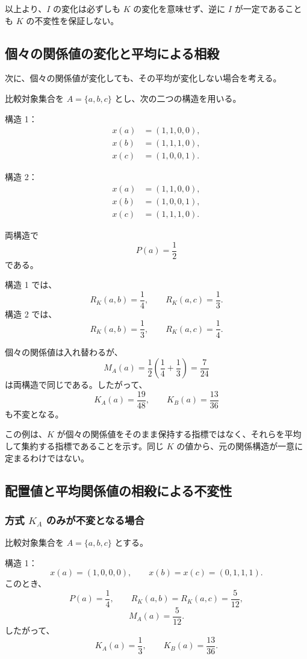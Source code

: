 \documentclass[a4paper,11pt]{ltjsarticle}
\begin{document}
以上より、$I$ の変化は必ずしも $K$ の変化を意味せず、逆に $I$ が一定であることも $K$ の不変性を保証しない。

\subsection{個々の関係値の変化と平均による相殺}

次に、個々の関係値が変化しても、その平均が変化しない場合を考える。

比較対象集合を $A=\{a,b,c\}$ とし、次の二つの構造を用いる。

構造 1：
\[
\begin{aligned}
x(a)&=(1,1,0,0),\\
x(b)&=(1,1,1,0),\\
x(c)&=(1,0,0,1).
\end{aligned}
\]

構造 2：
\[
\begin{aligned}
x(a)&=(1,1,0,0),\\
x(b)&=(1,0,0,1),\\
x(c)&=(1,1,1,0).
\end{aligned}
\]

両構造で
\[
P(a)=\frac12
\]
である。

構造 1 では、
\[
R_K(a,b)=\frac14,\qquad
R_K(a,c)=\frac13.
\]
構造 2 では、
\[
R_K(a,b)=\frac13,\qquad
R_K(a,c)=\frac14.
\]

個々の関係値は入れ替わるが、
\[
M_A(a)=\frac12\left(\frac14+\frac13\right)
=\frac7{24}
\]
は両構造で同じである。したがって、
\[
K_A(a)=\frac{19}{48},\qquad
K_B(a)=\frac{13}{36}
\]
も不変となる。

この例は、$K$ が個々の関係値をそのまま保持する指標ではなく、それらを平均して集約する指標であることを示す。同じ $K$ の値から、元の関係構造が一意に定まるわけではない。

\subsection{配置値と平均関係値の相殺による不変性}

\subsubsection{方式 $K_A$ のみが不変となる場合}

比較対象集合を $A=\{a,b,c\}$ とする。

構造 1：
\[
x(a)=(1,0,0,0),\qquad
x(b)=x(c)=(0,1,1,1).
\]
このとき、
\[
P(a)=\frac14,\qquad
R_K(a,b)=R_K(a,c)=\frac5{12},
\]
\[
M_A(a)=\frac5{12}.
\]
したがって、
\[
K_A(a)=\frac13,\qquad
K_B(a)=\frac{13}{36}.
\]
\end{document}

